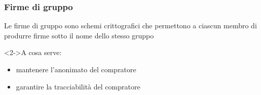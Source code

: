 \begin{frame}
\frametitle{Firme di gruppo}
Le firme di gruppo sono schemi crittografici che permettono a ciascun membro di produrre firme sotto il nome dello stesso gruppo
   \begin{center}\end{center}
\begin{block}<2->{A cosa serve:}
\begin{itemize}
\item mantenere l'\alert<2,2>{anonimato} del compratore
\item garantire la \alert<2,2>{tracciabilità} del compratore
\end{itemize}
\end{block}
\end{frame}

